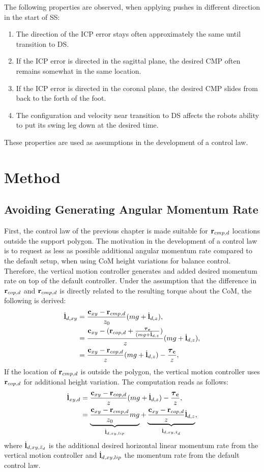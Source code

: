 The following properties are observed, when applying pushes in different direction in the start of \ac{SS}:
\begin{enumerate}
	\item The direction of the \ac{ICP} error stays often approximately the same until transition to \ac{DS}.
	\item If the \ac{ICP} error is directed in the sagittal plane, the desired \ac{CMP} often remains somewhat in the same location.
	\item If the \ac{ICP} error is directed  in the coronal plane, the desired \ac{CMP} slides from back to the forth of the foot.
	\item The configuration and velocity near transition to \ac{DS} affects the robots ability to put its swing leg down at the desired time. 
\end{enumerate}
These properties are used as assumptions in the development of a control law.
\section{Method}

\subsection{Avoiding Generating Angular Momentum Rate}
First, the control law of the previous chapter is made suitable for $\mathbf{r}_{cmp,d}$ locations outside the support polygon. The motivation in the development of a control law is to request as less as possible additional angular momentum rate compared to the default setup, when using \ac{CoM} height variations for balance control. Therefore, the vertical motion controller generates and added desired momentum rate on top of the default controller. Under the assumption that the difference in $\mathbf{r}_{cop,d}$ and $\mathbf{r}_{cmp,d}$ is directly related to the resulting torque about the \ac{CoM}, the following is derived:
\begin{align}
    \dot{\mathbf{l}}_{d,xy} &= \frac{\mathbf{c}_{xy}-\mathbf{r}_{cmp,d}}{z_0}(mg+\dot{\mathbf{l}}_{d,z}),\\
&=\frac{\mathbf{c}_{xy}-(\mathbf{r}_{cop,d}+\frac{\boldsymbol{\tau}_{\mathbf{c}}}{(mg+\dot{\mathbf{l}}_{d,z}})}{z}(mg+\dot{\mathbf{l}}_{d,z}), \\
&=\frac{\mathbf{c}_{xy}-\mathbf{r}_{cop,d}}{z}(mg + \dot{\mathbf{l}}_{d,z})- \frac{\boldsymbol{\tau}_{\mathbf{c}}}{z},
\end{align}
If the location of $\mathbf{r}_{cmp,d}$ is outside the polygon, the vertical motion controller uses $\mathbf{r}_{cop,d}$ for additional height variation. The computation reads as follows:
 \begin{align}
\dot{\mathbf{l}}_{xy,d}&=\frac{\mathbf{c}_{xy}-\mathbf{r}_{cop,d}}{z}(mg+\dot{\mathbf{l}}_{d,z}) - \frac{\boldsymbol{\tau}_{\mathbf{c}}}{z},\\
&=\underbrace{ \frac{\mathbf{c}_{xy}-\mathbf{r}_{cmp,d}} {z_0}mg}_{\dot{\mathbf{l}}_{d,xy,lip}}  + \underbrace{\frac{\mathbf{c}_{xy}-\mathbf{r}_{cop,d}}{z}\dot{\mathbf{l}}_{d,z}}_{\dot{\mathbf{l}}_{d,xy,\ddot{z}_d}},
\end{align}
where $\dot{\mathbf{l}}_{d,xy,\ddot{z}_d}$ is the additional desired horizontal linear momentum rate from the vertical motion controller and $\dot{\mathbf{l}}_{d,xy,lip}$ the momentum rate from the default control law.


